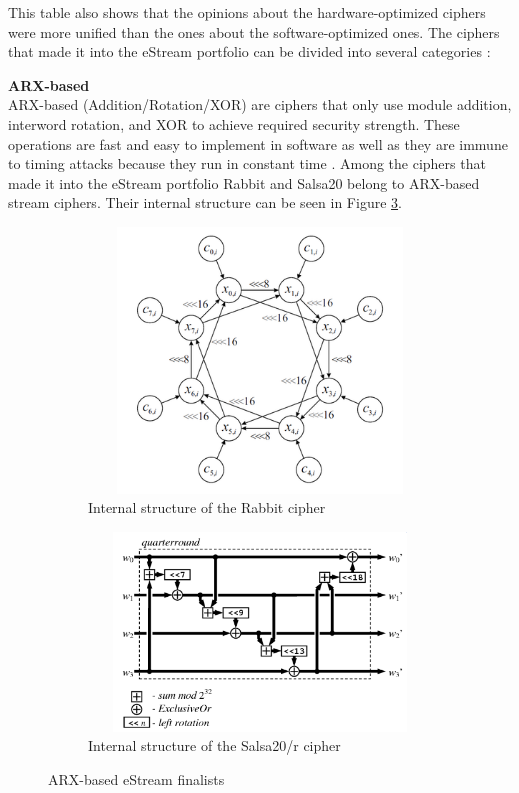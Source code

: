 This table also shows that the opinions about the hardware-optimized ciphers were more unified than the ones about the software-optimized ones.
The ciphers that made it into the eStream portfolio can be divided into several categories \cite{jiao2020stream}: \\

\clearpage

\textbf{ARX-based} \\

ARX-based (Addition/Rotation/XOR) are ciphers that only use module addition, interword rotation, and XOR to achieve required security strength. These operations are fast and easy to implement in software as well as they are immune to timing attacks because they run in constant time \cite{jiao2020stream}. Among the ciphers that made it into the eStream portfolio Rabbit and Salsa20 belong to ARX-based stream ciphers. Their internal structure can be seen in Figure \ref{fig:arx}.

\begin{figure}[h]
	\vspace{0.2cm}
	\begin{subfigure}{0.5\textwidth}
		\includegraphics[width=1\textwidth,height=200pt]{img/rabbit.png} 
		\vspace{5pt}
		\caption{Internal structure of the Rabbit cipher \cite{boesgaard2005stream}}
		\label{fig:rabbit}
	\end{subfigure}
	\begin{subfigure}{0.5\textwidth}
		\vspace{25pt}
		\includegraphics[width=1\textwidth,height=150pt]{img/salsa20.png} 
		\vspace{29pt}
		\caption{Internal structure of the Salsa20/r cipher \cite{Jarosaw2013LowcostHI}}
		\label{fig:salsa20}
	\end{subfigure}
	
	\caption{ARX-based eStream finalists}
	\label{fig:arx}
	\vspace{0.3cm}
\end{figure}


